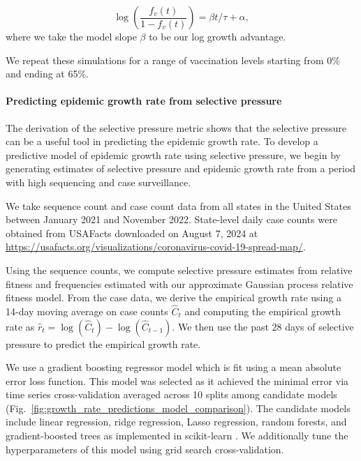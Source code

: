 \documentclass[11pt,oneside,letterpaper]{article}
\begin{document}
\begin{equation}
\log \left( \frac{f_v(t)}{1 - f_v(t)} \right) = \beta t / \tau + \alpha,
\end{equation}
where we take the model slope $\beta$ to be our log growth advantage.

We repeat these simulations for a range of vaccination levels starting from 0\% and ending at 65\%.

\paragraph{Predicting epidemic growth rate from selective pressure}

The derivation of the selective pressure metric shows that the selective pressure can be a useful tool in predicting the epidemic growth rate.
To develop a predictive model of epidemic growth rate using selective pressure, we begin by generating estimates of selective pressure and epidemic growth rate from a period with high sequencing and case surveillance.

We take sequence count and case count data from all states in the United States between January 2021 and November 2022.
State-level daily case counts were obtained from USAFacts downloaded on August 7, 2024 at \href{https://usafacts.org/visualizations/coronavirus-covid-19-spread-map/}{https://usafacts.org/visualizations/coronavirus-covid-19-spread-map/}.

Using the sequence counts, we compute selective pressure estimates from relative fitness and frequencies estimated with our approximate Gaussian process relative fitness model.
From the case data, we derive the empirical growth rate using a 14-day moving average on case counts $\hat{C}_{t}$ and computing the empirical growth rate as $\hat{r}_{t} = \log(\hat{C}_{t}) - \log(\hat{C}_{t-1})$.
We then use the past 28 days of selective pressure to predict the empirical growth rate.

We use a gradient boosting regressor model which is fit using a mean absolute error loss function.
This model was selected as it achieved the minimal error via time series cross-validation averaged across 10 splits among candidate models (Fig.~\ref{fig:growth_rate_predictions_model_comparison}).
The candidate models include linear regression, ridge regression, Lasso regression, random forests, and gradient-boosted trees as implemented in scikit-learn \cite{scikit-learn}.
We additionally tune the hyperparameters of this model using grid search cross-validation.
\end{document}
